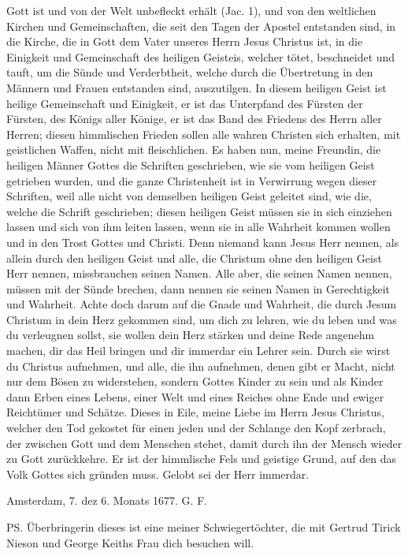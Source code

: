 {  Gott ist und von der Welt unbefleckt erhält (Jac. 1), und von den
  weltlichen Kirchen und Gemeinschaften, die seit den Tagen der
  Apostel entstanden sind, in die Kirche, die in Gott dem Vater
  unseres Herrn Jesus Christus ist, in die Einigkeit und Gemeinschaft
  des heiligen Geisteis, welcher tötet, 
  beschneidet und tauft, um die
  Sünde und Verderbtheit, welche durch die Übertretung in den
  Männern und Frauen entstanden sind, auszutilgen. In diesem
  heiligen Geist ist heilige Gemeinschaft und Einigkeit, er ist das
  Unterpfand des Fürsten der Fürsten, des Königs aller Könige,
  er ist das Band des Friedens des Herrn aller Herren; diesen
  himmlischen Frieden sollen alle wahren Christen sich erhalten, mit
  geistlichen Waffen, nicht mit fleischlichen.
  Es haben nun, meine Freundin, die heiligen Männer Gottes
  die Schriften geschrieben, wie sie vom heiligen Geist getrieben
  wurden, und die ganze Christenheit ist in Verwirrung wegen dieser
  Schriften, weil alle nicht von demselben heiligen Geist geleitet sind,
  wie die, welche die Schrift geschrieben; diesen heiligen Geist müssen
  sie in sich einziehen lassen und sich von ihm leiten lassen, wenn
  sie in alle Wahrheit kommen wollen und in den Trost Gottes
  und Christi. Denn niemand kann Jesus Herr nennen, als allein
  durch den heiligen Geist und alle, die Christum ohne den heiligen
  Geist Herr nennen, missbrauchen seinen Namen. Alle aber, die
  seinen Namen nennen, müssen mit der Sünde brechen, dann nennen
  sie seinen Namen in Gerechtigkeit und Wahrheit. Achte doch darum 
  auf die Gnade und Wahrheit, die durch Jesum Christum
  in dein Herz gekommen sind, um dich zu lehren, wie du leben
  und was du verleugnen sollst, sie wollen dein Herz stärken und
  deine Rede angenehm machen, dir das Heil bringen und dir
  immerdar ein Lehrer sein. Durch sie wirst du Christus aufnehmen,
  und alle, die ihn aufnehmen, denen gibt er Macht, nicht nur dem
  Bösen zu widerstehen, sondern Gottes Kinder zu sein und als
  Kinder dann Erben eines Lebens, einer Welt und eines Reiches
  ohne Ende und ewiger Reichtümer und Schätze. Dieses in Eile,
  meine Liebe im Herrn Jesus Christus, welcher den Tod gekostet
  für einen jeden und der Schlange den Kopf zerbrach, der zwischen
  Gott und dem Menschen stehet, damit durch ihn der Mensch wieder
  zu Gott zurückkehre. Er ist der himmlische Fels und geistige
  Grund, auf den das Volk Gottes sich gründen muss. Gelobt sei
  der Herr immerdar.

  \bigskip 

  \begin{flushright}Amsterdam, 7. dez 6. Monats 1677. G. F.\end{flushright}

  \bigskip 

  PS. Überbringerin dieses ist eine meiner Schwiegertöchter,
  die mit Gertrud Tirick Nieson 
  und George Keiths Frau dich 
  besuchen will.
}

